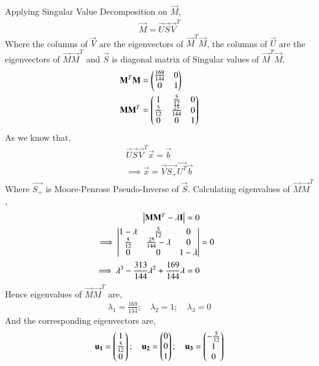 Applying Singular Value Decomposition on $\vec{M}$,
\begin{align} \label{eq:solutions/4/45/4/c/eq:eq_6}
    \vec{M}=\vec{U}\vec{S}\vec{V}^T
\end{align}
Where the columns of $\vec{V}$ are the eigenvectors of $\vec{M}^T\vec{M}$, the columns of $\vec{U}$ are the eigenvectors of $\vec{M}\vec{M}^T$ and $\vec{S}$ is diagonal matrix of Singular values of $\vec{M}^T\vec{M}$.
\begin{align}
    \mathbf{M}^T\mathbf{M} &= \begin{pmatrix}\frac{169}{144} & 0\\0 & 1\end{pmatrix} \\
    \mathbf{M}\mathbf{M}^T &= \begin{pmatrix}1 & \frac{5}{12} & 0\\\frac{5}{12} & \frac{25}{144} & 0\\ 0 & 0 & 1\end{pmatrix} 
\end{align}
As we know that,
\begin{align}
    \vec{U} \vec{S} \vec{V}^T \vec{x} = \vec{b} \nonumber \\
    \implies \vec{x} = \vec{V} \vec{S_+} \vec{U^T} \vec{b} \label{eq:solutions/4/45/4/c/eq:eq_9}
\end{align}
Where $\vec{S_+}$ is Moore-Penrose Pseudo-Inverse of $\vec{S}$. Calculating eigenvalues of $\vec{M}\vec{M}^T$,
\begin{align}
    \begin{vmatrix}\mathbf{M} \mathbf{M}^T - \lambda \mathbf{I}\end{vmatrix} = 0 \nonumber \\
    \implies \begin{vmatrix}1-\lambda & \frac{5}{12} & 0 \\ \frac{5}{12} & \frac{25}{144}-\lambda & 0 \\ 0 & 0 & 1-\lambda\end{vmatrix} &= 0 \nonumber \\
    \implies \lambda^3 - \frac{313}{144}\lambda^2 + \frac{169}{144}\lambda =0 \nonumber
\end{align}
Hence eigenvalues of $\vec{M}\vec{M}^T$ are,
\begin{align} \label{eq:solutions/4/45/4/c/eq:eq_10}
    \lambda_1 = \frac{169}{144}; \quad \lambda_2 = 1; \quad \lambda_3 =0
\end{align}
And the corresponding eigenvectors are,
\begin{align}
    \mathbf{u_1} = \begin{pmatrix}1 \\ \frac{5}{12} \\ 0\end{pmatrix}; \quad \mathbf{u_2} = \begin{pmatrix}0 \\ 0 \\ 1\end{pmatrix}; \quad
    \mathbf{u_3} = \begin{pmatrix}-\frac{5}{12} \\ 1 \\ 0\end{pmatrix} \label{eq:solutions/4/45/4/c/eq:eq_11} 
\end{align}
